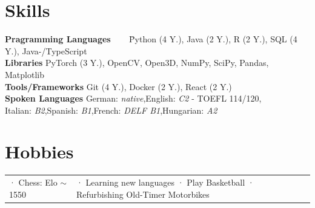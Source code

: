 \documentclass[letterpaper,11pt]{article}
\begin{document}
\section{Skills}
\begin{itemize}[leftmargin=0.15in, label={}]
    \small{\item{
                    \begin{tabbing}
                        \textbf{Pragramming Languages} ~~~ \={Python (4 Y.), Java (2 Y.), R (2 Y.), SQL (4 Y.), Java-/TypeScript} \\
                        \textbf{Libraries} \> {PyTorch (3 Y.), OpenCV, Open3D, NumPy, SciPy, Pandas, Matplotlib} \\
                        \textbf{Tools/Frameworks} \> {Git (4 Y.), Docker (2 Y.), React (2 Y.)} \\
                        \textbf{Spoken Languages} \> {German: \textit{native},\quad English: \textit{C2} - TOEFL 114/120},\ \\ \> Italian: \textit{B2},\quad \quad \quad  Spanish: \textit{B1},\quad French: \textit{DELF B1},\quad Hungarian: \textit{A2}



                    \end{tabbing}
                }}
\end{itemize}

\vspace{-10pt}
\section{Hobbies}
\begin{tabular}{ l l l}
    
    \quad \small · Chess:  Elo $\sim$ 1550 \quad \quad \quad &\small \quad · Learning new languages \quad \quad · \small Play Basketball \quad \quad · Refurbishing Old-Timer Motorbikes 
\end{tabular}
\end{document}

